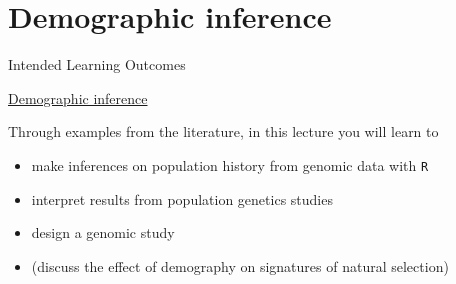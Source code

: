 
\section{Demographic inference}


\begin{frame}{Intended Learning Outcomes}

	\underline{Demographic inference}

	Through examples from the literature, in this lecture you will learn to
	\begin{itemize}
		\item make inferences on population history from genomic data with \texttt{R}
		\item interpret results from population genetics studies
		\item design a genomic study
		\item (discuss the effect of demography on signatures of natural selection)
	\end{itemize}

\end{frame}


